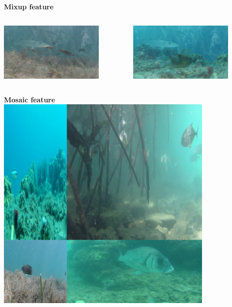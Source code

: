 \documentclass[serif]{beamer}  %
\begin{document}
\begin{frame}
\centering
\textbf{Mixup feature}
\begin{columns}
\begin{column}{0.5\textwidth}
	\centering
	\includegraphics[width=0.8\textwidth]{images/mixup_1.jpg}
\end{column}

\begin{column}{0.5\textwidth}
	\centering
	\includegraphics[width=0.8\textwidth]{images/mixup_2.jpg}
\end{column}
\end{columns}

\vspace{0.3cm}

\begin{columns}
\begin{column}{0.5\textwidth}
	\centering
	\textbf{Mosaic feature}
	\includegraphics[width=0.8\textwidth]{images/mosaic.jpg}	
\end{column}


\end{columns}
\end{frame}
\end{document}
